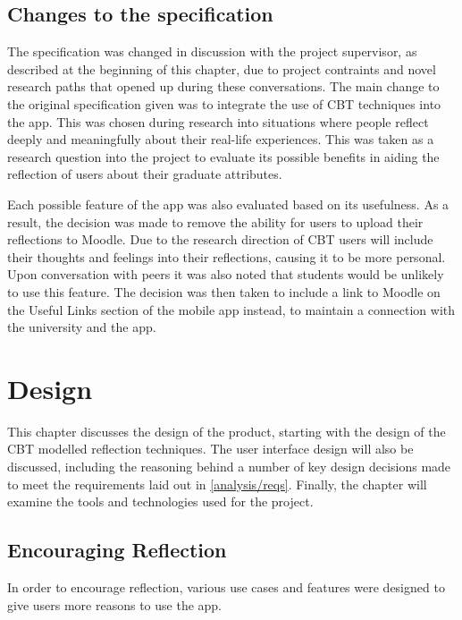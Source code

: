 \documentclass{l4proj}
\begin{document}
\section{Changes to the specification}

The specification was changed in discussion with the project supervisor, as described at the beginning of this chapter, due to project contraints and novel research paths that opened up during these conversations. The main change to the original specification given was to integrate the use of CBT techniques into the app. This was chosen during research into situations where people reflect deeply and meaningfully about their real-life experiences. This was taken as a research question into the project to evaluate its possible benefits in aiding the reflection of users about their graduate attributes. 

Each possible feature of the app was also evaluated based on its usefulness. As a result, the decision was made to remove the ability for users to upload their reflections to Moodle. Due to the research direction of CBT users will include their thoughts and feelings into their reflections, causing it to be more personal. Upon conversation with peers it was also noted that students would be unlikely to use this feature. The decision was then taken to include a link to Moodle on the Useful Links section of the mobile app instead, to maintain a connection with the university and the app. 


\chapter{Design}

This chapter discusses the design of the product, starting with the design of the CBT modelled reflection techniques. The user interface design will also be discussed, including the reasoning behind a number of key design decisions made to meet the requirements laid out in \ref{analysis/reqs}. Finally, the chapter will examine the tools and technologies used for the project. 

\section{Encouraging Reflection}

In order to encourage reflection, various use cases and features were designed to give users more reasons to use the app.
\end{document}
